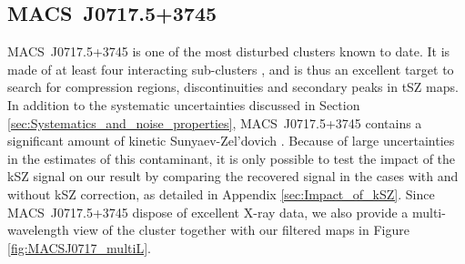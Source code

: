 \documentclass[twocolumn,traditabstract]{aa}
\begin{document}
\subsection{MACS~J0717.5+3745}\label{sec:MACSJ0717}
\mbox{MACS~J0717.5+3745} is one of the most disturbed clusters known to date. It is made of at least four interacting sub-clusters \citep{Ma2009}, and is thus an excellent target to search for compression regions, discontinuities and secondary peaks in tSZ maps. In addition to the systematic uncertainties discussed in Section \ref{sec:Systematics_and_noise_properties}, \mbox{MACS~J0717.5+3745} contains a significant amount of kinetic Sunyaev-Zel'dovich \citep[kSZ,][]{Sunyaev1980}. Because of large uncertainties in the estimates of this contaminant, it is only possible to test the impact of the kSZ signal on our result by comparing the recovered signal in the cases with and without kSZ correction, as detailed in Appendix \ref{sec:Impact_of_kSZ}. Since \mbox{MACS~J0717.5+3745} dispose of excellent X-ray data, we also provide a multi-wavelength view of the cluster together with our filtered maps in Figure \ref{fig:MACSJ0717_multiL}.
\end{document}
